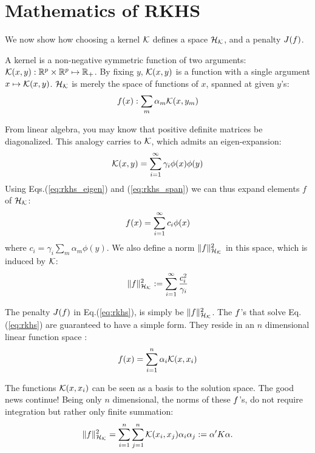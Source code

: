 \section{Mathematics of RKHS}
We now show how choosing a kernel $\mathcal{K}$ defines a space $\mathcal{H}_{\mathcal{K}}$, and a penalty $J(f)$.

A kernel is a non-negative symmetric function of two arguments: $\mathcal{K}(x,y): \mathbb{R}^p \times \mathbb{R}^p \mapsto \mathbb{R}_+$.
By fixing $y$, $\mathcal{K}(x,y)$ is a function with a single argument $x \mapsto \mathcal{K}(x,y)$.
$\mathcal{H}_{\mathcal{K}}$ is merely the space of functions of $x$, spanned at given $y$'s: 
\begin{align}
\label{eq:rkhs_span}
	f(x):\sum_m \alpha_m \mathcal{K}(x,y_m)
\end{align} 

From linear algebra, you may know that positive definite matrices be diagonalized. 
This analogy carries to $\mathcal{K}$, which admits an eigen-expansion: 
\begin{align}
\label{eq:rkhs_eigen}
	\mathcal{K}(x,y)=\sum_{i=1}^\infty \gamma_i \phi(x) \phi(y)
\end{align}
Using Eqs.(\ref{eq:rkhs_eigen}) and (\ref{eq:rkhs_span}) we can thus expand elements $f$ of $\mathcal{H}_{\mathcal{K}}$: 
\begin{align}
	f(x)=\sum_{i=1}^\infty c_i \phi(x)
\end{align}
where $c_i=\gamma_i \sum_m \alpha_m \phi(y)$.
We also define a norm $\Vert f \Vert_{\mathcal{H}_{\mathcal{K}}}^2$ in this space, which is induced by $\mathcal{K}$:
\begin{align}
\label{eq:rkhs_norm}
	\Vert f \Vert_{\mathcal{H}_{\mathcal{K}}}^2 := \sum_{i=1}^\infty \frac{c_i^2}{\gamma_i}
\end{align}

The penalty $J(f)$ in Eq.(\ref{eq:rkhs}), is simply be $\Vert f \Vert_{\mathcal{H}_{\mathcal{K}}}^2$.
The $f$'s that solve Eq.(\ref{eq:rkhs}) are guaranteed to have a simple form. They reside in an $n$ dimensional linear function space \citep{wahba_spline_1990}:
\begin{align}
	f(x)=\sum_{i=1}^n \alpha_i \mathcal{K}(x,x_i)
\end{align}

The functions $\mathcal{K}(x,x_i)$ can be seen as a basis to the solution space. 
The good news continue! Being only $n$ dimensional, the norms of these $f$'s, do not require integration but rather only finite summation:
\begin{align}
	\Vert f \Vert_{\mathcal{H}_{\mathcal{K}}}^2=\sum_{i=1}^n \sum_{j=1}^n \mathcal{K}(x_i,x_j) \alpha_i \alpha_{j} := \alpha' K \alpha.
\end{align}

